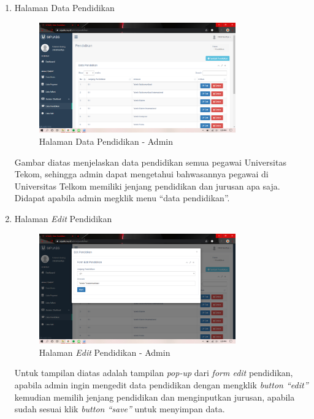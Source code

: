 \begin{enumerate}
	\item Halaman Data Pendidikan
	\begin{figure}
		\centering
		\includegraphics[width=0.8\textwidth]
		{pics/admin/implementasi/datapendidikan.png}
		\caption{Halaman Data Pendidikan - Admin}
		\label{fig:CC10}
	\end{figure}
	Gambar diatas menjelaskan data pendidikan semua pegawai Universitas Tekom, sehingga admin dapat mengetahui bahwasannya pegawai di Universitas Telkom memiliki jenjang pendidikan dan jurusan apa saja. Didapat apabila admin megklik menu “data pendidikan”.
	
	\item Halaman \textit{Edit} Pendidikan
	\begin{figure}
		\centering
		\includegraphics[width=0.8\textwidth]
		{pics/admin/implementasi/editpendidikan.png}
		\caption{Halaman \textit{Edit} Pendidikan - Admin}
		\label{fig:CC10}
	\end{figure}
	Untuk tampilan diatas adalah tampilan \textit{pop-up} dari \textit{form edit} pendidikan, apabila admin ingin mengedit data pendidikan dengan mengklik \textit{button “edit”} kemudian memilih jenjang pendidikan dan menginputkan jurusan, apabila sudah sesuai klik \textit{button “save”} untuk menyimpan data.
	

\end{enumerate}
